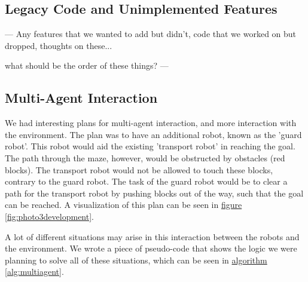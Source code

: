 \documentclass[10pt, abstracton, twocolumn]{scrartcl}
\newcommand{\fref}[1]{\hyperref[#1]{figure \vref{#1}}}
\newcommand{\aref}[1]{\hyperref[#1]{algorithm \vref{#1}}}
\begin{document}



\clearpage

\begin{appendices}

\section{Legacy Code and Unimplemented Features}
---
Any features that we wanted to add but didn't, code that we worked on but dropped, thoughts on these...

what should be the order of these things?
---

\subsection{Multi-Agent Interaction}
\label{sec:multiagent}
We had interesting plans for multi-agent interaction, and more interaction with the environment. The plan was to have an additional robot, known as the 'guard robot'. This robot would aid the existing 'transport robot' in reaching the goal. The path through the maze, however, would be obstructed by obstacles (red blocks). The transport robot would not be allowed to touch these blocks, contrary to the guard robot. The task of the guard robot would be to clear a path for the transport robot by pushing blocks out of the way, such that the goal can be reached. A visualization of this plan can be seen in \fref{fig:photo3development}.

A lot of different situations may arise in this interaction between the robots and the environment. We wrote a piece of pseudo-code that shows the logic we were planning to solve all of these situations, which can be seen in \aref{alg:multiagent}.


\end{appendices}
\end{document}
